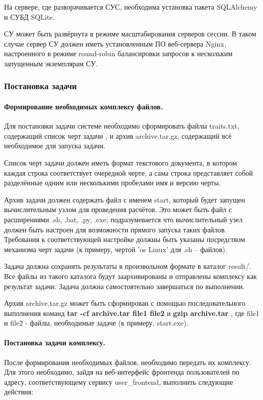 \documentclass[a4paper,12pt]{report}
\numberwithin{equation}{section}
\begin{document}
  На сервере, где разворачивается СУС, необходима установка пакета SQLAlchemy и СУБД SQLite.
  
  СУ может быть развёрнута в режиме масштабирования серверов сессии. 
  В таком случае сервер СУ должен иметь установленным ПО веб-сервера Nginx, настроенного в режиме round-robin балансировки запросов к нескольким запущенным экземплярам СУ.
  
  \subsubsection{Постановка задачи}
  \paragraph{Формирование необходимых комплексу файлов.}
  Для постановки задачи системе необходимо сформировать файлы traits.txt, содержащий список черт задачи
  , и архив archive.tar.gz, содержащий всё необходимое для запуска задачи.
  
  Список черт задачи должен иметь формат текстового документа, в котором каждая строка
  соответствует очередной черте, а сама строка представляет собой разделённые одним или несколькими пробелами имя и версию черты.
  
  Архив задачи должен содержать файл с именем start, который будет запущен вычислительным узлом для проведения расчётов.
  Это может быть файл с расширениями .sh, .bat, .py, .exe; подразумевается что вычислительный узел должен быть настроен для возможности прямого запуска таких файлов.
  Требования к соответствующей настройке должны быть указаны посредством механизма черт задачи (к примеру, чертой 'os Linux' для .sh -- файлов).
  
  Задача должна сохранять результаты в произвольном формате в каталог result/. 
  Все файлы из такого каталога будут заархивированы и отправлены комплексу как результат задачи.
  Задача должна самостоятельно завершаться по выполнении.
  
  Архив archive.tar.gz может быть сформирован с помощью последовательного выполнения команд
  \textbf{ tar -cf archive.tar file1 file2 } и 
  \textbf{ gzip archive.tar }
  , где file1 и file2 - файлы, необходимые задаче (к примеру, start.exe).
  
  \paragraph{Постановка задачи комплексу.}
  После формирования необходимых файлов, необходимо передать их комплексу.
  Для этого необходимо, зайдя на веб-интерфейс фронтенда пользователей по адресу, соответствующему сервису user\_frontend, выполнить следующие действия:
  
\end{document}
